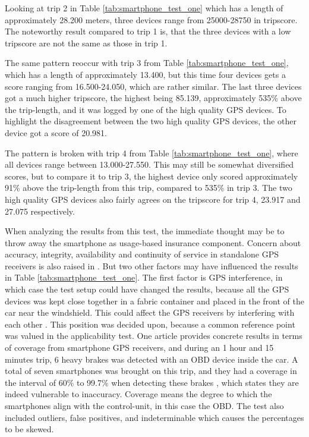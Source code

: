 Looking at trip 2 in Table \ref{tab:smartphone_test_one} which has a length of approximately 28.200 meters, three devices range from 25000-28750 in tripscore. The noteworthy result compared to trip 1 is, that the three devices with a low tripscore are not the same as those in trip 1.

The same pattern reoccur with trip 3 from Table \ref{tab:smartphone_test_one}, which has a length of approximately 13.400, but this time four devices gets a score ranging from 16.500-24.050, which are rather similar. The last three devices got a much higher tripscore, the highest being 85.139, approximately 535\% above the trip-length, and it was logged by one of the high quality GPS devices. To highlight the disagreement between the two high quality GPS devices, the other device got a score of 20.981. 

The pattern is broken with trip 4 from Table \ref{tab:smartphone_test_one}, where all devices range between 13.000-27.550. This may still be somewhat diversified scores, but to compare it to trip 3, the highest device only scored approximately 91\% above the trip-length from this trip, compared to 535\% in trip 3. The two high quality GPS devices also fairly agrees on the tripscore for trip 4, 23.917 and 27.075 respectively. 

When analyzing the results from this test, the immediate thought may be to throw away the smartphone as usage-based insurance component. Concern about accuracy, integrity, availability and continuity of service in standalone GPS receivers is also raised in \citep{art:challenges_smartphone_ubi} \citep{art:survey_mobile_phone_sensing} \citep{art:smartphones_for_monitoring_and_ubi} \citep{art:insurtelematics} \citep{art:in-car_positioning_technologies}. But two other factors may have influenced the results in Table \ref{tab:smartphone_test_one}. The first factor is GPS interference, in which case the test setup could have changed the results, because all the GPS devices was kept close together in a fabric container and placed in the front of the car near the windshield. This could affect the GPS receivers by interfering with each other \citep{art:gps_interference_two} \citep{art:gps_interference_one}. This position was decided upon, because a common reference point was valued in the applicability test. One article provides concrete results in terms of coverage from smartphone GPS receivers, and during an 1 hour and 15 minutes trip, 6 heavy brakes was detected with an OBD device inside the car. A total of seven smartphones was brought on this trip, and they had a coverage in the interval of 60\% to 99.7\% when detecting these brakes \citep{art:insurtelematics}, which states they are indeed vulnerable to inaccuracy. Coverage means the degree to which the smartphones align with the control-unit, in this case the OBD. The test also included outliers, false positives, and indeterminable which causes the percentages to be skewed.

